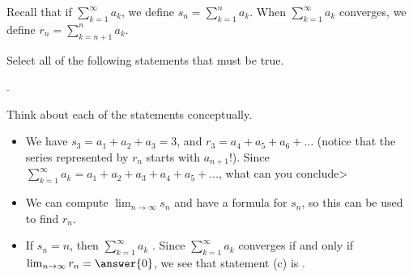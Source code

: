 \documentclass{ximera}
\author{Jim Talamo}
\begin{document}
\begin{exercise}

Recall that if $\sum_{k=1}^{\infty} a_k$, we define $s_n = \sum_{k=1}^n a_k$.  When $\sum_{k=1}^{\infty} a_k$ converges, we define $r_n = \sum_{k=n+1}^n a_k$. 

Select all of the following statements that must be true.

\begin{selectAll}
.
\end{selectAll}

\begin{hint}
Think about each of the statements conceptually.

\begin{itemize}
\item We have $s_3=a_1+a_2+a_3 = 3$, and $r_3 = a_4+a_5+a_6+\ldots$ (notice that the series represented by $r_n$ starts with $a_{n+1}$!).  Since $\sum_{k=1}^{\infty} a_k = a_1+a_2+a_3+a_4+a_5 + \ldots$, what can you conclude>

\item We can compute $\lim_{n \to \infty} s_n$ and have a formula for $s_n$, so this can be used to find $r_n$.

\item If $s_n=n$, then $\sum_{k=1}^{\infty} a_k$ .  Since $\sum_{k=1}^{\infty} a_k$ converges if and only if $\lim_{n \to \infty} r_n = \answer{0}$, we see that statement  (c) is .
\end{itemize}
\end{hint}
\end{exercise}
\end{document}
